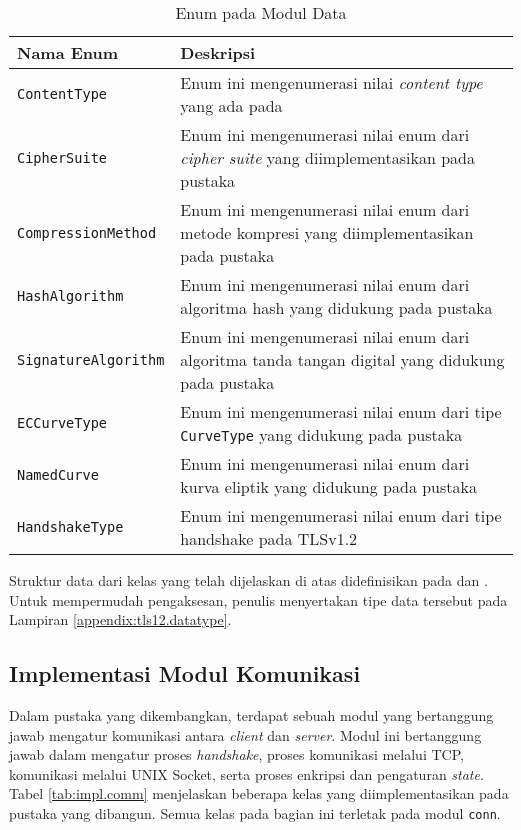 \begin{table}[!h]
  \centering
  \caption{Enum pada Modul Data} \label{tab:impl.enum}
  \begin{tabular}{|p{3.75cm}|p{9cm}|}
    \hline
    Nama Enum & Deskripsi \\ \hline
    \texttt{ContentType} & Enum ini mengenumerasi nilai \emph{content type} yang ada pada \textcite{rfc5246} \\ \hline
    \texttt{CipherSuite} & Enum ini mengenumerasi nilai enum dari \emph{cipher suite} yang diimplementasikan pada pustaka \\ \hline
    \texttt{CompressionMethod} & Enum ini mengenumerasi nilai enum dari metode kompresi yang diimplementasikan pada pustaka \\ \hline
    \texttt{HashAlgorithm} & Enum ini mengenumerasi nilai enum dari algoritma hash yang didukung pada pustaka \\ \hline
    \texttt{SignatureAlgorithm} & Enum ini mengenumerasi nilai enum dari algoritma tanda tangan digital yang didukung pada pustaka \\ \hline
    \texttt{ECCurveType} & Enum ini mengenumerasi nilai enum dari tipe \texttt{CurveType} yang didukung pada pustaka\\ \hline
    \texttt{NamedCurve} & Enum ini mengenumerasi nilai enum dari kurva eliptik yang didukung pada pustaka\\ \hline
    \texttt{HandshakeType} & Enum ini mengenumerasi nilai enum dari tipe handshake pada TLSv1.2\\ \hline
  \end{tabular}
\end{table}

Struktur data dari kelas yang telah dijelaskan di atas didefinisikan pada \textcite{rfc5246} dan \textcite{rfc4492}. Untuk mempermudah pengaksesan, penulis menyertakan tipe data tersebut pada Lampiran \ref{appendix:tls12.datatype}.

\subsection{Implementasi Modul Komunikasi}

Dalam pustaka yang dikembangkan, terdapat sebuah modul yang bertanggung jawab mengatur komunikasi antara \emph{client} dan \emph{server}. Modul ini bertanggung jawab dalam mengatur proses \emph{handshake}, proses komunikasi melalui TCP, komunikasi melalui UNIX Socket, serta proses enkripsi dan pengaturan \emph{state}. Tabel \ref{tab:impl.comm} menjelaskan beberapa kelas yang diimplementasikan pada pustaka yang dibangun. Semua kelas pada bagian ini terletak pada modul \texttt{conn}.

